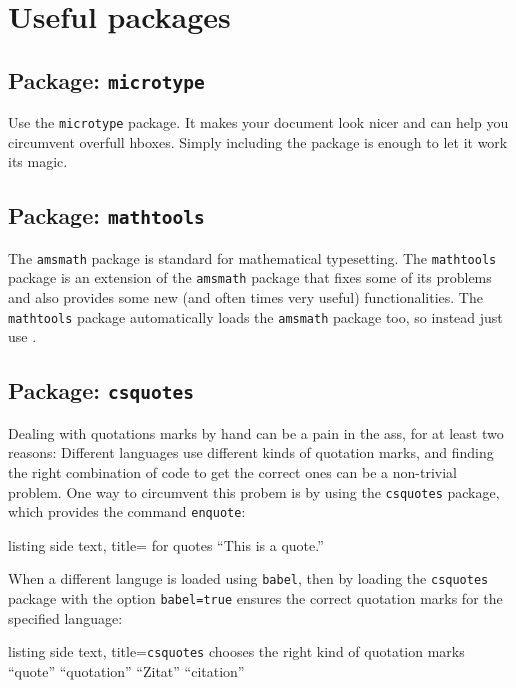 \chapter{Useful packages}





\section{Package: \texttt{microtype}}

Use the \texttt{microtype} package.
It makes your document look nicer and can help you circumvent overfull hboxes.
Simply including the package is enough to let it work its magic.





\section{Package: \texttt{mathtools}}

The \texttt{amsmath} package is standard for mathematical typesetting.
The \texttt{mathtools} package is an extension of the \texttt{amsmath} package that fixes some of its problems and also provides some new (and often times very useful) functionalities.
The \texttt{mathtools} package automatically loads the \texttt{amsmath} package too, so instead  just use .





\section{Package: \texttt{csquotes}}

Dealing with quotations marks by hand can be a pain in the ass, for at least two reasons:
Different languages use different kinds of quotation marks, and finding the right combination of  code to get the correct ones can be a non-trivial problem.
One way to circumvent this probem is by using the \texttt{csquotes} package, which provides the command \texttt{enquote}:
\begin{tcblisting}{listing side text, title={ for quotes}}
\enquote{This is a quote.}
\end{tcblisting}
When a different languge is loaded using \texttt{babel}, then by loading the \texttt{csquotes} package with the option \texttt{babel=true} ensures the correct quotation marks for the specified language:
\begin{tcblisting}{listing side text, title={\texttt{csquotes} chooses the right kind of quotation marks}}
\enquote{quote}
\enquote{quotation}
\enquote{Zitat}
\enquote{citation}
\end{tcblisting}

